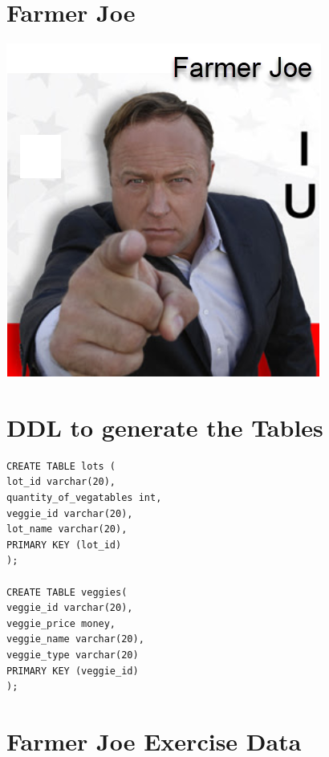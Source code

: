 \section  * {Farmer Joe}
\includegraphics[scale=0.6]{images/FarmerJoe.png}

\section{DDL to generate the Tables}
\begin{verbatim}
CREATE TABLE lots (
lot_id varchar(20),
quantity_of_vegatables int,
veggie_id varchar(20),
lot_name varchar(20),
PRIMARY KEY (lot_id)
);

CREATE TABLE veggies(
veggie_id varchar(20),
veggie_price money,
veggie_name varchar(20),
veggie_type varchar(20)
PRIMARY KEY (veggie_id)
);
\end{verbatim}


\section {Farmer Joe Exercise Data}


